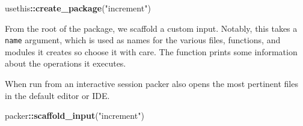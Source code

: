 \documentclass[10pt,]{krantz}
\makeatletter
\newenvironment{Shaded}{\begin{snugshade}}{\end{snugshade}}
\newcommand{\KeywordTok}[1]{\textcolor[rgb]{0.27,0.27,0.27}{\textbf{#1}}}
\newcommand{\NormalTok}[1]{#1}
\newcommand{\OperatorTok}[1]{\textcolor[rgb]{0.43,0.43,0.43}{\textbf{#1}}}
\newcommand{\StringTok}[1]{\textcolor[rgb]{0.5,0.5,0.5}{#1}}
\newenvironment{kframe}{%
\medskip{}
\setlength{\fboxsep}{.8em}
 \def\at@end@of@kframe{}%
 \ifinner\ifhmode%
  \def\at@end@of@kframe{\end{minipage}}%
  \begin{minipage}{\columnwidth}%
 \fi\fi%
 \def\FrameCommand##1{\hskip\@totalleftmargin \hskip-\fboxsep
 \colorbox{shadecolor}{##1}\hskip-\fboxsep
     \hskip-\linewidth \hskip-\@totalleftmargin \hskip\columnwidth}%
 \MakeFramed {\advance\hsize-\width
   \@totalleftmargin\z@ \linewidth\hsize
   \@setminipage}}%
 {\par\unskip\endMakeFramed%
 \at@end@of@kframe}
\renewenvironment{Shaded}{\begin{kframe}}{\end{kframe}}
\makeatother
\begin{document}
\begin{Shaded}
\begin{Highlighting}[]
\NormalTok{usethis}\OperatorTok{::}\KeywordTok{create_package}\NormalTok{(}\StringTok{"increment"}\NormalTok{)}
\end{Highlighting}
\end{Shaded}

From the root of the package, we scaffold a custom input. Notably, this takes a \texttt{name} argument, which is used as names for the various files, functions, and modules it creates so choose it with care. The function prints some information about the operations it executes.

When run from an interactive session packer also opens the most pertinent files in the default editor or IDE.

\begin{Shaded}
\begin{Highlighting}[]
\NormalTok{packer}\OperatorTok{::}\KeywordTok{scaffold_input}\NormalTok{(}\StringTok{"increment"}\NormalTok{)}
\end{Highlighting}
\end{Shaded}
\end{document}
